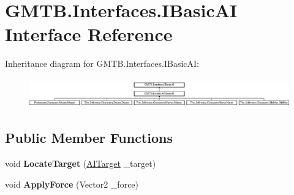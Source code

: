 \hypertarget{interface_g_m_t_b_1_1_interfaces_1_1_i_basic_a_i}{}\section{G\+M\+T\+B.\+Interfaces.\+I\+Basic\+AI Interface Reference}
\label{interface_g_m_t_b_1_1_interfaces_1_1_i_basic_a_i}
Inheritance diagram for G\+M\+T\+B.\+Interfaces.\+I\+Basic\+AI\+:\begin{figure}[H]
\begin{center}
\leavevmode
\includegraphics[height=1.277567cm]{interface_g_m_t_b_1_1_interfaces_1_1_i_basic_a_i}
\end{center}
\end{figure}
\subsection*{Public Member Functions}
\begin{DoxyCompactItemize}
\item 
\mbox{\label{interface_g_m_t_b_1_1_interfaces_1_1_i_basic_a_i_a79bcfc842a7ba54ae5d20ad2578672b7}} 
void {\bfseries Locate\+Target} (\mbox{\hyperlink{interface_g_m_t_b_1_1_interfaces_1_1_a_i_target}{A\+I\+Target}} \+\_\+target)
\item 
\mbox{\label{interface_g_m_t_b_1_1_interfaces_1_1_i_basic_a_i_a014d6198957d55b38ca926f945441600}} 
void {\bfseries Apply\+Force} (Vector2 \+\_\+force)
\end{DoxyCompactItemize}
